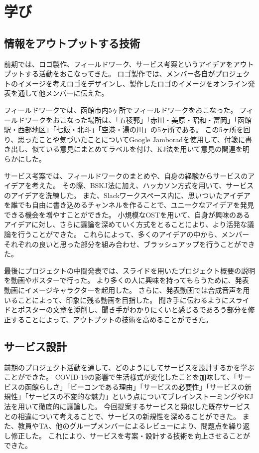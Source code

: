 \chapter{学び}

\section{情報をアウトプットする技術}
前期では、ロゴ製作、フィールドワーク、サービス考案というアイデアをアウトプットする活動をおこなってきた。
ロゴ製作では、メンバー各自がプロジェクトのイメージを考えロゴをデザインし、製作したロゴのイメージをオンライン発表を通して他メンバーに伝えた。

フィールドワークでは、函館市内5ヶ所でフィールドワークをおこなった。
フィールドワークをおこなった場所は、「五稜郭」「赤川・美原・昭和・富岡」「函館駅・西部地区」「七飯・北斗」「空港・湯の川」の5ヶ所である。
この5ヶ所を回り、思ったことや気づいたことについてGoogle Jamboradを使用して、付箋に書き出し、似ている意見にまとめてラベルを付け、KJ法を用いて意見の関連を明らかにした。

サービス考案では、フィールドワークのまとめや、自身の経験からサービスのアイデアを考えた。
その際、BSKJ法に加え、ハッカソン方式を用いて、サービスのアイデアを洗練した。
また、Slackワークスペース内に、思いついたアイデアを誰でも自由に書き込めるチャンネルを作ることで、ユニークなアイデアを発見できる機会を増やすことができた。
小規模なOSTを用いて、自身が興味のあるアイデアに対し、さらに議論を深めていく方式をとることにより、より活発な議論を行うことができた。
これらによって、多くのアイデアの中から、メンバーそれぞれの良いと思った部分を組み合わせ、ブラッシュアップを行うことができた。

最後にプロジェクトの中間発表では、スライドを用いたプロジェクト概要の説明を動画やポスターで行った。
より多くの人に興味を持ってもらうために、発表動画にイメージキャラクターを起用した。
さらに、発表動画では合成音声を用いることによって、印象に残る動画を目指した。
聞き手に伝わるようにスライドとポスターの文章を添削し、聞き手がわかりにくいと感じるであろう部分を修正することによって、アウトプットの技術を高めることができた。

\section{サービス設計}
前期のプロジェクト活動を通して、どのようにしてサービスを設計するかを学ぶことができた。
COVID-19の影響で生活様式が変化したことを加味して、「サービスの函館らしさ」「ビーコンである理由」「サービスの必要性」「サービスの新規性」「サービスの不変的な魅力」という点についてブレインストーミングやKJ法を用いて徹底的に議論した。
今回提案するサービスと類似した既存サービスとの相違について考えることで、サービスの新規性を深めることができた。
また、教員やTA、他のグループメンバーによるレビューにより、問題点を繰り返し修正した。
これにより、サービスを考案・設計する技術を向上させることができた。

